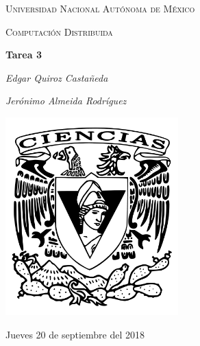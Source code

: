 \documentclass[12pt,a4paper]{report}
\begin{document}
\begin{titlepage}
	\centering
	{\scshape\LARGE Universidad Nacional Autónoma de México \par}
	\vspace{1cm}
	{\scshape\Large Computación Distribuida\par}
	\vspace{1.5cm}
	{\huge\bfseries Tarea 3\par}
	\vspace{.5cm}
	{\Large\itshape Edgar Quiroz Castañeda \par}
    \vspace{.5cm}
	{\Large\itshape Jerónimo Almeida Rodríguez \par}
	\vfill
	 \includegraphics[width=0.5\textwidth]{escudo_f-ciencias.png}
	\vfill

	{\large Jueves 20 de septiembre del 2018 \par}
\end{titlepage}

\pagebreak
\setlength{\voffset}{-0.75in}
\setlength{\headsep}{5pt}


\newcommand{\is}[1]{V_{\{#1, x, r\}}} %
\end{document}
